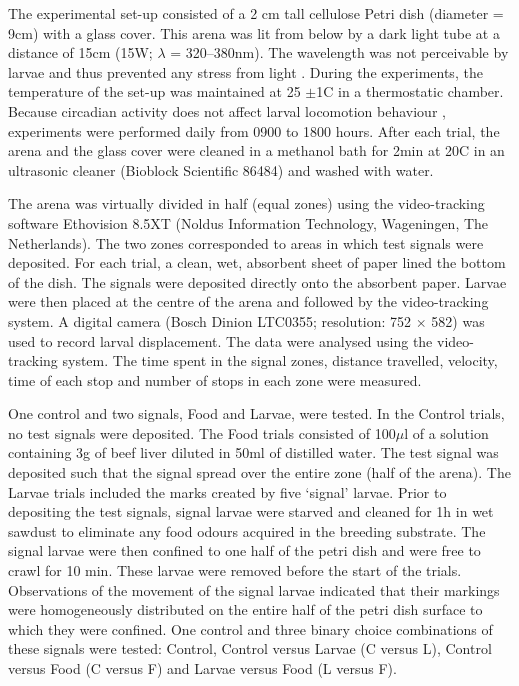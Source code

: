 The experimental set-up consisted of a 2 cm tall cellulose Petri dish (diameter = 9cm) with a glass cover. This arena was lit from below by a dark light tube at a distance of 15cm (15W; $\lambda$ = 320–380nm). The wavelength was not perceivable by larvae \citep{strange_spectral_1961} and thus prevented any stress from light \citep{hinnemann_see_2010}. During the experiments, the temperature of the set-up was maintained at 25 $\pm$1C in a thermostatic chamber. Because circadian activity does not affect larval locomotion behaviour \citep{joplin_effects_1999}, experiments were performed daily from 0900 to 1800 hours. After each trial, the arena and the glass cover were cleaned in a methanol bath for 2min at 20C in an ultrasonic cleaner (Bioblock Scientific 86484) and washed with water.

The arena was virtually divided in half (equal zones) using the video-tracking software Ethovision 8.5XT (Noldus Information Technology, Wageningen, The Netherlands). The two zones corresponded to areas in which test signals were deposited. For each trial, a clean, wet, absorbent sheet of paper lined the bottom of the dish. The signals were deposited directly onto the absorbent paper. Larvae were then placed at the centre of the arena and followed by the video-tracking system. A digital camera (Bosch Dinion LTC0355; resolution: 752 $\times$ 582) was used to record larval displacement. The data were analysed using the video-tracking system. The time spent in the signal zones, distance travelled, velocity, time of each stop and number of stops in each zone were measured.

One control and two signals, Food and Larvae, were tested. In the Control trials, no test signals were deposited. The Food trials consisted of 100$\mu$l of a solution containing 3g of beef liver diluted in 50ml of distilled water. The test signal was deposited such that the signal spread over the entire zone (half of the arena). The Larvae trials included the marks created by five ‘signal’ larvae. Prior to depositing the test signals, signal larvae were starved and cleaned for 1h in wet sawdust to eliminate any food odours acquired in the breeding substrate. The signal larvae were then confined to one half of the petri dish and were free to crawl for 10 min. These larvae were removed before the start of the trials. Observations of the movement of the signal larvae indicated that their markings were homogeneously distributed on the entire half of the petri dish surface to which they were confined. One control and three binary choice combinations of these signals were tested: Control, Control versus Larvae (C versus L), Control versus Food (C versus F) and Larvae versus Food (L versus F).

